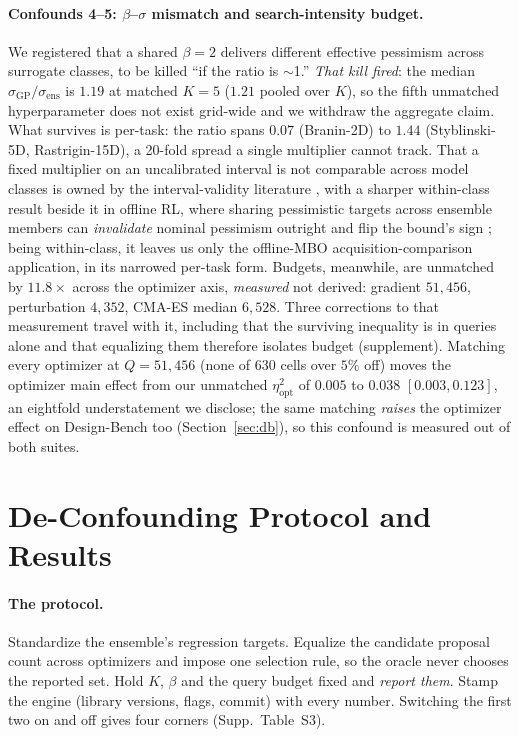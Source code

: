 \documentclass[letterpaper]{article} %
\theoremstyle{plain}
\newcommand{\mdemph}[1]{\emph{#1}}
\begin{document}
\paragraph{Confounds 4--5: $\beta$--$\sigma$ mismatch and search-intensity budget.} We registered that a shared $\beta{=}2$ delivers different effective pessimism across surrogate classes, to be killed ``if the ratio is $\sim$1.'' \mdemph{That kill fired}: the median $\sigma_{\text{GP}}/\sigma_{\text{ens}}$ is $1.19$ at matched $K{=}5$ ($1.21$ pooled over $K$), so the fifth unmatched hyperparameter does not exist grid-wide and we withdraw the aggregate claim. What survives is per-task: the ratio spans $0.07$ (Branin-2D) to $1.44$ (Styblinski-5D, Rastrigin-15D), a 20-fold spread a single multiplier cannot track. That a fixed multiplier on an uncalibrated interval is not comparable across model classes is owned by the interval-validity literature \citep{dewolf2022intervals}, with a sharper within-class result beside it in offline RL, where sharing pessimistic targets across ensemble members can \mdemph{invalidate} nominal pessimism outright and flip the bound's sign \citep{ghasemipour2022pessimistic}; being within-class, it leaves us only the offline-MBO acquisition-comparison application, in its narrowed per-task form. Budgets, meanwhile, are unmatched by $11.8\times$ across the optimizer axis, \mdemph{measured} not derived: gradient $51{,}456$, perturbation $4{,}352$, CMA-ES median $6{,}528$. Three corrections to that measurement travel with it, including that the surviving inequality is in queries alone and that equalizing them therefore isolates budget (supplement). Matching every optimizer at $Q{=}51{,}456$ (none of 630 cells over $5\%$ off) moves the optimizer main effect from our unmatched $\eta^2_{\text{opt}}$ of $0.005$ to $0.038$ $[0.003,0.123]$, an eightfold understatement we disclose; the same matching \mdemph{raises} the optimizer effect on Design-Bench too (Section~\ref{sec:db}), so this confound is measured out of both suites.

\section{De-Confounding Protocol and Results}
\label{sec:deconf}

\paragraph{The protocol.} Standardize the ensemble's regression targets. Equalize the candidate proposal count across optimizers and impose one selection rule, so the oracle never chooses the reported set. Hold $K$, $\beta$ and the query budget fixed and \mdemph{report them}. Stamp the engine (library versions, flags, commit) with every number. Switching the first two on and off gives four corners (Supp.\ Table~S3).
\end{document}
